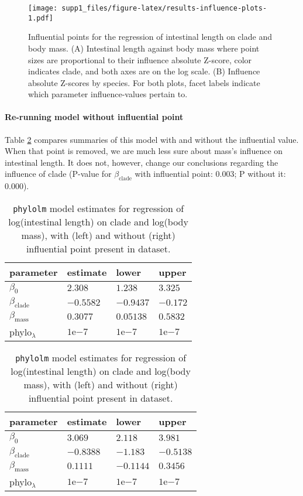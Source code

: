 \documentclass[12pt,]{article}
\let\oldparagraph\paragraph
\renewcommand{\paragraph}[1]{\oldparagraph{#1}\mbox{}}
\begin{document}
\begin{figure}
\centering
\texttt{[image: supp1\_files/figure-latex/results-influence-plots-1.pdf]}
\caption{\label{fig:results-influence-plots}Influential points for the regression of intestinal length on clade and body mass. (A) Intestinal length against body mass where point sizes are proportional to their influence absolute Z-score, color indicates clade, and both axes are on the log scale. (B) Influence absolute Z-scores by species. For both plots, facet labels indicate which parameter influence-values pertain to.}
\end{figure}

\hypertarget{re-running-model-without-influential-point}{%
\paragraph{Re-running model without influential point}\label{re-running-model-without-influential-point}}

Table \ref{tab:results-re-run-summ-dfs} compares summaries of this model
with and without the influential value.
When that point is removed, we are much less sure about mass's influence on
intestinal length.
It does not, however, change our conclusions regarding the influence of clade
(P-value for \(\beta_{\text{clade}}\) with influential point:
0.003;
P without it: 0.000).

\begin{table}
\caption{\label{tab:results-re-run-summ-dfs}\texttt{phylolm} model estimates for regression of log(intestinal length) on clade and log(body mass), with (left) and  without (right) influential point present in dataset.}

\centering
\begin{tabular}{llll}
\toprule
parameter & estimate & lower & upper\\
\midrule
$\beta_0$ & $2.308$ & $1.238$ & $3.325$\\
$\beta_{\text{clade}}$ & $-0.5582$ & $-0.9437$ & $-0.172$\\
$\beta_{\text{mass}}$ & $0.3077$ & $0.05138$ & $0.5832$\\
phylo$_{\lambda}$ & $1 \mathrm{e}{-7}$ & $1 \mathrm{e}{-7}$ & $1 \mathrm{e}{-7}$\\
\bottomrule
\end{tabular}
\centering
\begin{tabular}{llll}
\toprule
parameter & estimate & lower & upper\\
\midrule
$\beta_0$ & $3.069$ & $2.118$ & $3.981$\\
$\beta_{\text{clade}}$ & $-0.8388$ & $-1.183$ & $-0.5138$\\
$\beta_{\text{mass}}$ & $0.1111$ & $-0.1144$ & $0.3456$\\
phylo$_{\lambda}$ & $1 \mathrm{e}{-7}$ & $1 \mathrm{e}{-7}$ & $1 \mathrm{e}{-7}$\\
\bottomrule
\end{tabular}
\end{table}
\end{document}
